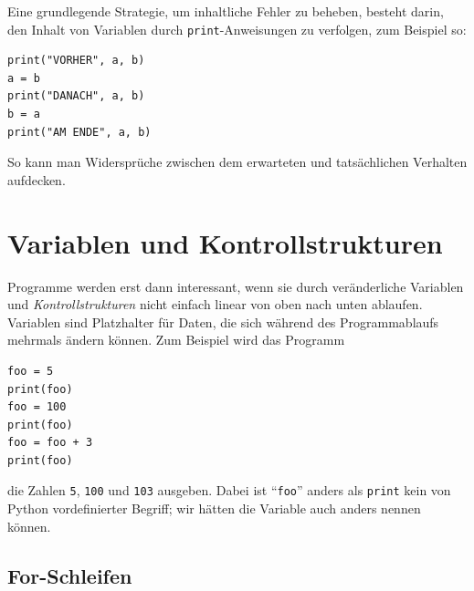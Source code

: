 \documentclass{blatt}
\begin{document}
Eine grundlegende Strategie, um inhaltliche Fehler zu beheben, besteht darin,
den Inhalt von Variablen durch \texttt{print}-Anweisungen zu
verfolgen, zum Beispiel so:
\begin{verbatim}
print("VORHER", a, b)
a = b
print("DANACH", a, b)
b = a
print("AM ENDE", a, b)
\end{verbatim}
So kann man Widersprüche zwischen dem erwarteten und tatsächlichen Verhalten
aufdecken.


\section{Variablen und Kontrollstrukturen}

Programme werden erst dann interessant, wenn sie durch veränderliche Variablen und
\emph{Kontrollstrukturen} nicht einfach linear von oben nach unten ablaufen.
Variablen sind Platzhalter für Daten, die sich während des Programmablaufs
mehrmals ändern können. Zum Beispiel wird das Programm
\begin{verbatim}
foo = 5
print(foo)
foo = 100
print(foo)
foo = foo + 3
print(foo)
\end{verbatim}
die Zahlen \texttt{5}, \texttt{100} und \texttt{103} ausgeben. Dabei ist "`\texttt{foo}"'
anders als \texttt{print} kein von Python vordefinierter
Begriff; wir hätten die Variable auch anders nennen können.


\subsection{For-Schleifen}
\end{document}
